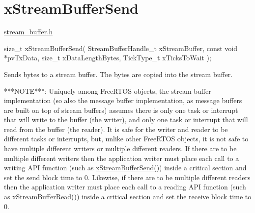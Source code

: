 \hypertarget{group__x_stream_buffer_send}{}\section{x\+Stream\+Buffer\+Send}
\label{group__x_stream_buffer_send}
\mbox{\hyperlink{stream__buffer_8h}{stream\+\_\+buffer.\+h}}


\begin{DoxyPre}
size\_t xStreamBufferSend( StreamBufferHandle\_t xStreamBuffer,
                          const void *pvTxData,
                          size\_t xDataLengthBytes,
                          TickType\_t xTicksToWait );

\begin{DoxyPre}\end{DoxyPre}
\end{DoxyPre}



\begin{DoxyPre}
\begin{DoxyPre}   Sends bytes to a stream buffer.  The bytes are copied into the stream buffer.\end{DoxyPre}
\end{DoxyPre}



\begin{DoxyPre}
\begin{DoxyPre}   ***NOTE***:  Uniquely among FreeRTOS objects, the stream buffer
   implementation (so also the message buffer implementation, as message buffers
   are built on top of stream buffers) assumes there is only one task or
   interrupt that will write to the buffer (the writer), and only one task or
   interrupt that will read from the buffer (the reader).  It is safe for the
   writer and reader to be different tasks or interrupts, but, unlike other
   FreeRTOS objects, it is not safe to have multiple different writers or
   multiple different readers.  If there are to be multiple different writers
   then the application writer must place each call to a writing API function
   (such as \mbox{\hyperlink{stream__buffer_8h_a35cdf3b6bf677086b9128782f762499d}{xStreamBufferSend()}}) inside a critical section and set the send
   block time to 0.  Likewise, if there are to be multiple different readers
   then the application writer must place each call to a reading API function
   (such as xStreamBufferRead()) inside a critical section and set the receive
   block time to 0.\end{DoxyPre}
\end{DoxyPre}



